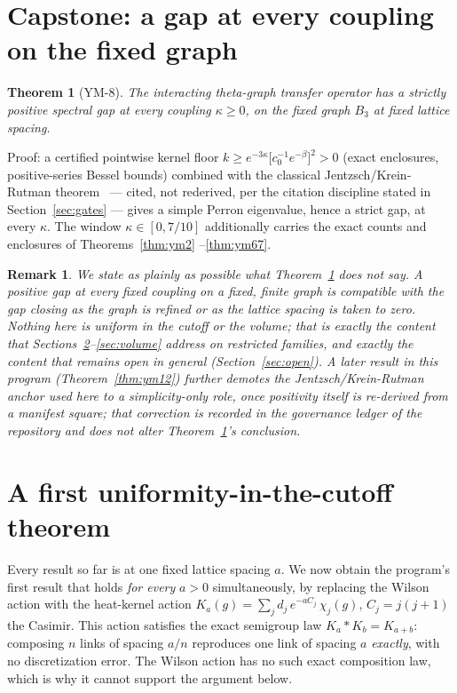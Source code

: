 \documentclass[aps,prd,twocolumn,superscriptaddress,nofootinbib]{revtex4-2}
\newtheorem{theorem}{Theorem}
\newtheorem{remark}{Remark}
\begin{document}
\section{Capstone: a gap at every coupling on the fixed graph}\label{sec:capstone}

\begin{theorem}[YM-8]\label{thm:ym8}
The interacting theta-graph transfer operator has a strictly positive
spectral gap at \emph{every} coupling $\kappa\ge0$, on the fixed graph
$B_3$ at fixed lattice spacing.
\end{theorem}

Proof: a certified pointwise kernel floor
$k\ge e^{-3\kappa}\big[c_0^{-1}e^{-\beta}\big]^2>0$ (exact enclosures,
positive-series Bessel bounds) combined with the classical
Jentzsch/Krein-Rutman theorem~\cite{Jentzsch,KreinRutman} --- cited, not
rederived, per the citation discipline stated in
Section~\ref{sec:gates} --- gives a simple Perron eigenvalue, hence a
strict gap, at every $\kappa$. The window $\kappa\in[0,7/10]$ additionally
carries the exact counts and enclosures of Theorems~\ref{thm:ym2}
--\ref{thm:ym67}.

\begin{remark}
We state as plainly as possible what Theorem~\ref{thm:ym8} does
\emph{not} say. A positive gap at every fixed coupling on a fixed,
finite graph is compatible with the gap closing as the graph is refined
or as the lattice spacing is taken to zero. Nothing here is uniform in
the cutoff or the volume; that is exactly the content that
Sections~\ref{sec:uniform}--\ref{sec:volume} address on restricted
families, and exactly the content that remains open in general
(Section~\ref{sec:open}). A later result in this program
(Theorem~\ref{thm:ym12}) further demotes the Jentzsch/Krein-Rutman
anchor used here to a \emph{simplicity-only} role, once positivity
itself is re-derived from a manifest square; that correction is recorded
in the governance ledger of the repository and does not alter
Theorem~\ref{thm:ym8}'s conclusion.
\end{remark}

\section{A first uniformity-in-the-cutoff theorem}\label{sec:uniform}

Every result so far is at one fixed lattice spacing $a$. We now obtain
the program's first result that holds \emph{for every} $a>0$
simultaneously, by replacing the Wilson action with the heat-kernel
action $K_a(g)=\sum_j d_j\,e^{-aC_j}\,\chi_j(g)$, $C_j=j(j+1)$ the
Casimir. This action satisfies the exact semigroup law
$K_a * K_b = K_{a+b}$: composing $n$ links of spacing $a/n$ reproduces
one link of spacing $a$ \emph{exactly}, with no discretization error.
The Wilson action has no such exact composition law, which is why it
cannot support the argument below.
\end{document}
